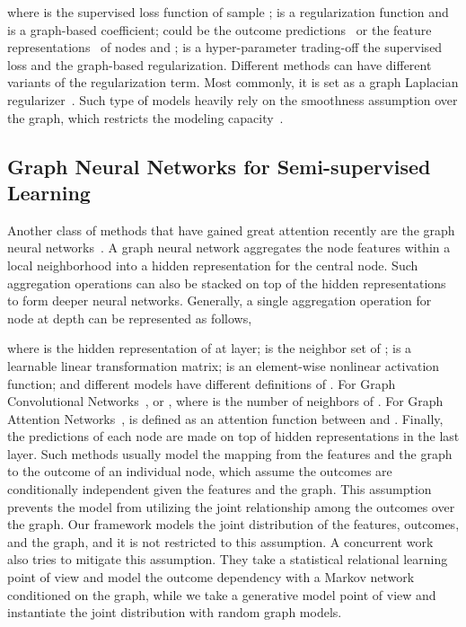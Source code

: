 \documentclass{article}
\begin{document}
where  is the supervised loss function of sample ;  is a regularization function and  is a graph-based coefficient;  could be the outcome predictions~\cite{zhu2003semi,zhou2004learning,belkin2006manifold} or the feature representations~\cite{mei2008general,weston2012deep,li2019prediction} of nodes  and ;  is a hyper-parameter trading-off the supervised loss and the graph-based regularization. Different methods can have different variants of the regularization term. Most commonly, it is set as a graph Laplacian regularizer~\cite{zhu2003semi,zhou2004learning,belkin2006manifold,mei2008general,weston2012deep}. Such type of models heavily rely on the smoothness assumption over the graph, which restricts the modeling capacity~\cite{kipf2016semi}.  

\subsection{Graph Neural Networks for Semi-supervised Learning}
Another class of methods that have gained great attention recently are the graph neural networks~\cite{kipf2016semi,hamilton2017inductive,velivckovic2017graph}. A graph neural network aggregates the node features within a local neighborhood into a hidden representation for the central node. Such aggregation operations can also be stacked on top of the hidden representations to form deeper neural networks. Generally, a single aggregation operation for node  at depth  can be represented as follows,

where  is the hidden representation of  at  layer;  is the neighbor set of ;  is a learnable linear transformation matrix;  is an element-wise nonlinear activation function; and different models have different definitions of . For Graph Convolutional Networks~\cite{kipf2016semi},  or , where  is the number of neighbors of . For Graph Attention Networks~\cite{velivckovic2017graph},  is defined as an attention function between  and . Finally, the predictions of each node are made on top of hidden representations in the last layer. Such methods usually model the mapping from the features and the graph to the outcome of an individual node, which assume the outcomes are conditionally independent given the features and the graph. This assumption prevents the model from utilizing the joint relationship among the outcomes over the graph. Our framework models the joint distribution of the features, outcomes, and the graph, and it is not restricted to this assumption. A concurrent work~\cite{qu2019gmnn} also tries to mitigate this assumption. They take a statistical relational learning point of view and model the outcome dependency with a Markov network conditioned on the graph, while we take a generative model point of view and instantiate the joint distribution with random graph models.
\end{document}
